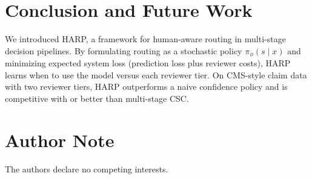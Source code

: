 \documentclass[conference]{IEEEtran}
\begin{document}
\section{Conclusion and Future Work}

We introduced HARP, a framework for human-aware routing in multi-stage decision pipelines.
By formulating routing as a stochastic policy $\pi_\phi(s \mid x)$ and minimizing expected
system loss (prediction loss plus reviewer costs), HARP learns when to use the model versus
each reviewer tier. On CMS-style claim data with two reviewer tiers, HARP outperforms a naive 
confidence policy and is competitive with or better than multi-stage CSC.


\section*{Author Note}
The authors declare no competing interests.



\end{document}
